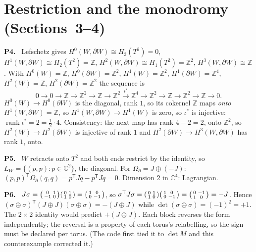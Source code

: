 \documentclass[11pt]{article}
\newcommand{\Z}{\mathbb{Z}}
\newcommand{\C}{\mathbb{C}}
\newcommand{\rank}{\operatorname{rank}}
\newenvironment{solution}[1]{\medskip\noindent\textbf{P#1.}\ }{\par\medskip}
\begin{document}
\section*{Restriction and the monodromy (Sections~3--4)}

\begin{solution}{4}
Lefschetz gives $H^0(W,\partial W)\cong H_3(T^2)=0$, $H^1(W,\partial W)\cong H_2(T^2)=\Z$,
$H^2(W,\partial W)\cong H_1(T^2)=\Z^2$, $H^3(W,\partial W)\cong\Z$. With $H^0(W)=\Z$,
$H^0(\partial W)=\Z^2$, $H^1(W)=\Z^2$, $H^1(\partial W)=\Z^4$, $H^2(W)=\Z$, $H^2(\partial W)=\Z^2$
the sequence is
\[
  0\to 0\to\Z\to\Z^2\to\Z\to\Z^2\xrightarrow{\ \iota^*\ }\Z^4\to\Z^2\to\Z\to\Z^2\to\Z\to 0 .
\]
$H^0(W)\to H^0(\partial W)$ is the diagonal, rank $1$, so its cokernel $\Z$ maps
\emph{onto} $H^1(W,\partial W)=\Z$, so $H^1(W,\partial W)\to H^1(W)$ is zero, so
$\iota^*$ is injective: $\rank\iota^* = 2 = \tfrac12\cdot 4$. Consistency: the
next map has rank $4-2=2$, onto $\Z^2$, so $H^2(W)\to H^2(\partial W)$ is injective
of rank $1$ and $H^2(\partial W)\to H^3(W,\partial W)$ has rank $1$, onto.
\end{solution}

\begin{solution}{5}
$W$ retracts onto $T^2$ and both ends restrict by the identity, so
$L_W = \{(p,p): p\in\C^2\}$, the diagonal. For $\Omega_\partial = J\oplus(-J)$:
$(p,p)^{\mathsf T}\Omega_\partial(q,q) = p^{\mathsf T}Jq - p^{\mathsf T}Jq = 0$. Dimension $2$
in $\C^4$: Lagrangian.
\end{solution}

\begin{solution}{6}
$J\sigma = \begin{psmallmatrix}0&1\\-1&0\end{psmallmatrix}\begin{psmallmatrix}0&1\\1&0\end{psmallmatrix}
= \begin{psmallmatrix}1&0\\0&-1\end{psmallmatrix}$, so
$\sigma^{\mathsf T}J\sigma = \begin{psmallmatrix}0&1\\1&0\end{psmallmatrix}\begin{psmallmatrix}1&0\\0&-1\end{psmallmatrix}
= \begin{psmallmatrix}0&-1\\1&0\end{psmallmatrix} = -J$. Hence
$(\sigma\oplus\sigma)^{\mathsf T}(J\oplus J)(\sigma\oplus\sigma) = -(J\oplus J)$ while
$\det(\sigma\oplus\sigma) = (-1)^2 = +1$. The $2\times2$ identity would predict
$+(J\oplus J)$. Each block reverses the form independently; the reversal is a
property of each torus's relabelling, so the sign must be declared per torus.
(The code first tied it to $\det M$ and this counterexample corrected it.)
\end{solution}
\end{document}
